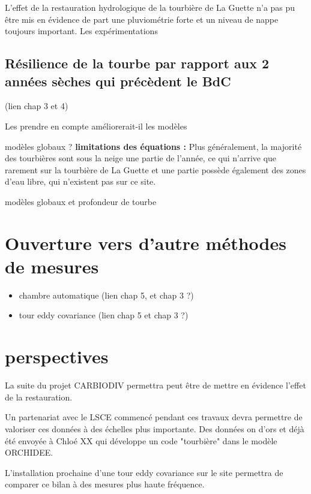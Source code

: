 L'effet de la restauration hydrologique de la tourbière de La Guette n'a pas pu être mis en évidence de part une pluviométrie forte et un niveau de nappe toujours important.
Les expérimentations

\subsection{Résilience de la tourbe par rapport aux 2 années sèches qui précèdent le BdC}
(lien chap 3 et 4)

%
%
%
%


Les prendre en compte améliorerait-il les modèles

modèles globaux ?
\textbf{limitations des équations :}
Plus généralement, la majorité des tourbières sont sous la neige une partie de l'année, ce qui n'arrive que rarement sur la tourbière de La Guette et une partie possède également des zones d'eau libre, qui n'existent pas sur ce site.

modèles globaux et profondeur de tourbe


\section{Ouverture vers d'autre méthodes de mesures}
\begin{itemize}
\item chambre automatique (lien chap 5, et chap 3 ?)
\item tour eddy covariance (lien chap 5 et chap 3 ?)
\end{itemize}

\section{perspectives}

La suite du projet CARBIODIV permettra peut être de mettre en évidence l'effet de la restauration.

Un partenariat avec le LSCE commencé pendant ces travaux devra permettre de valoriser ces données à des échelles plus importante.
Des données on d'ors et déjà été envoyée à Chloé XX qui développe un code "tourbière" dans le modèle ORCHIDEE.

L'installation prochaine d'une tour eddy covariance sur le site permettra de comparer ce bilan à des mesures plus haute fréquence.

